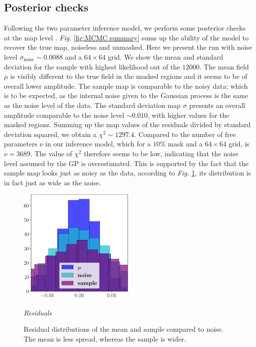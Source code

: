 \subsection{Posterior checks}
Following the two parameter inference model, we perform some posterior checks at the map level \cite{fwdmodel2}. \textit{Fig. }\ref{fig:MCMC summary}
sums up the ability of the model to recover the true map, noiseless and unmasked. Here we present the run with noise level $\sigma_\text{noise}\sim 0.0088$ and a $64\times64$ grid. We show the mean and standard deviation for the sample with highest likelihood out of the $12000$. The mean field $\mu$ is visibly different to the true field in the masked regions and it seems to be of overall lower amplitude. The sample map is comparable to the noisy data; which is to be expected, as the internal noise given to the Gaussian process is the same as the noise level of the data. The standard deviation map $\sigma$ presents an overall amplitude comparable to the noise level $\sim 0.010$, with higher values for the masked regions. Summing up the map values of the residuals divided by standard deviation squared, we obtain a $\chi^2\sim 1297.4$. Compared to the number of free parameters $\nu$ in our inference model, which for a $10\%$ mask and a $64\times64$ grid, is $\nu=3689$. The value of $\chi^2$ therefore seems to be low, indicating that the noise level assumed by the GP is overestimated. This is supported by the fact that the sample map looks just as noisy as the data, according to \textit{Fig. }\ref{fig:residuals vs noise}, its distribution is in fact just as wide as the noise.

\begin{figure}[h]
    \centering
    \includegraphics[width=0.5\textwidth]{images/5_residuals_vs_noise.pdf}
    \par \hspace{0.3cm} \textit{Residuals}
    \caption{\label{fig:residuals vs noise} Residual distributions of the mean and sample compared to noise. The mean is less spread, whereas the sample is wider.}
\end{figure}


